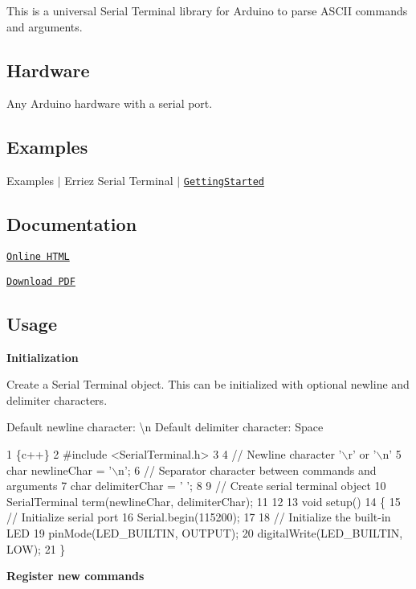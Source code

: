 \href{https://travis-ci.org/Erriez/ErriezSerialTerminal}{\tt }

This is a universal Serial Terminal library for Arduino to parse A\+S\+C\+II commands and arguments.



\subsection*{Hardware}

Any Arduino hardware with a serial port.

\subsection*{Examples}


\begin{DoxyItemize}
\item Examples $\vert$ Erriez Serial Terminal $\vert$ \href{https://github.com/Erriez/ErriezSerialTerminal/blob/master/examples/GettingStarted/GettingStarted.ino}{\tt Getting\+Started}
\end{DoxyItemize}

\subsection*{Documentation}


\begin{DoxyItemize}
\item \href{https://erriez.github.io/ErriezSerialTerminal}{\tt Online H\+T\+ML}
\item \href{https://github.com/Erriez/ErriezSerialTerminal/raw/gh-pages/latex/ErriezSerialTerminal.pdf}{\tt Download P\+DF}
\end{DoxyItemize}

\subsection*{Usage}

{\bfseries Initialization}

Create a Serial Terminal object. This can be initialized with optional newline and delimiter characters.

Default newline character\+: {\ttfamily \textquotesingle{}\textbackslash{}n\textquotesingle{}} Default delimiter character\+: {\ttfamily Space}


\begin{DoxyCode}
1 \{c++\}
2 #include <SerialTerminal.h>
3 
4 // Newline character '\(\backslash\)r' or '\(\backslash\)n'
5 char newlineChar = '\(\backslash\)n'; 
6 // Separator character between commands and arguments
7 char delimiterChar = ' ';
8 
9 // Create serial terminal object
10 SerialTerminal term(newlineChar, delimiterChar);
11 
12 
13 void setup()
14 \{
15     // Initialize serial port
16     Serial.begin(115200);
17 
18     // Initialize the built-in LED
19     pinMode(LED\_BUILTIN, OUTPUT);
20     digitalWrite(LED\_BUILTIN, LOW);
21 \}
\end{DoxyCode}
 {\bfseries Register new commands}

